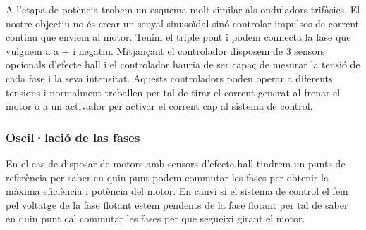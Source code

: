 A l'etapa de potència trobem un esquema molt similar als onduladors trifàsics. El nostre objectiu no és crear un senyal sinusoïdal sinó controlar impulsos de corrent continu que enviem al motor. Tenim el triple pont i podem connecta la fase que vulguem a a + i negatiu. Mitjançant el controlador disposem de 3 sensors opcionals d'efecte hall i el controlador hauria de ser capaç de mesurar la tensió de cada fase i la seva intensitat. Aquests controladors poden operar a diferents tensions i normalment treballen per tal de tirar el corrent generat al frenar el motor o a un activador per activar el corrent cap al sistema de control.

\subsubsection{Oscil·lació de las fases}

En el cas de disposar de motors amb sensors d'efecte hall tindrem un punts de referència per saber en quin punt podem commutar les fases per obtenir la màxima eficiència i potència del motor. En canvi si el sistema de control el fem pel voltatge de la fase flotant estem pendents de la fase flotant per tal de saber en quin punt cal commutar les fases per que segueixi girant el motor.

